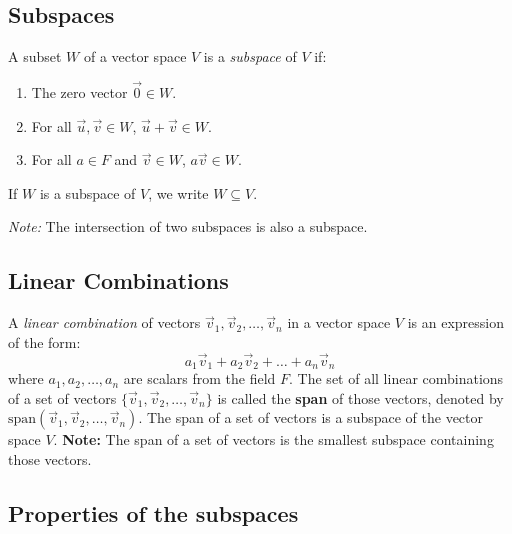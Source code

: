 \subsection{Subspaces}

A subset \(W\) of a vector space \(V\) is a \emph{subspace} of \(V\) if:

\begin{enumerate}[label=\Roman*.]
	\item The zero vector \(\vec{0} \in W\).
	\item For all \(\vec{u}, \vec{v} \in W\), \(\vec{u} + \vec{v} \in W\).
	\item For all \(a \in F\) and \(\vec{v} \in W\), \(a\vec{v} \in W\).
\end{enumerate}
If \(W\) is a subspace of \(V\), we write \(W \subseteq V\).

\emph{Note:} The intersection of two subspaces is also a subspace.

\subsection{Linear Combinations}

A \emph{linear combination} of vectors \(\vec{v}_1, \vec{v}_2, \ldots, \vec{v}_n\) in a vector space \(V\) is an expression of
the form:
\[
	a_1\vec{v}_1 + a_2\vec{v}_2 + \ldots + a_n\vec{v}_n
\]
where \(a_1, a_2, \ldots, a_n\) are scalars from the field \(F\).
The set of all linear combinations of a set of vectors \(\{\vec{v}_1, \vec{v}_2, \ldots, \vec{v}_n\}\) is called the \textbf{span} of those vectors,
denoted by \(\text{span}(\vec{v}_1, \vec{v}_2, \ldots, \vec{v}_n)\).
The span of a set of vectors is a subspace of the vector space \(V\).
\textbf{Note:} The span of a set of vectors is the smallest subspace containing those vectors.

\subsection{Properties of the subspaces}

